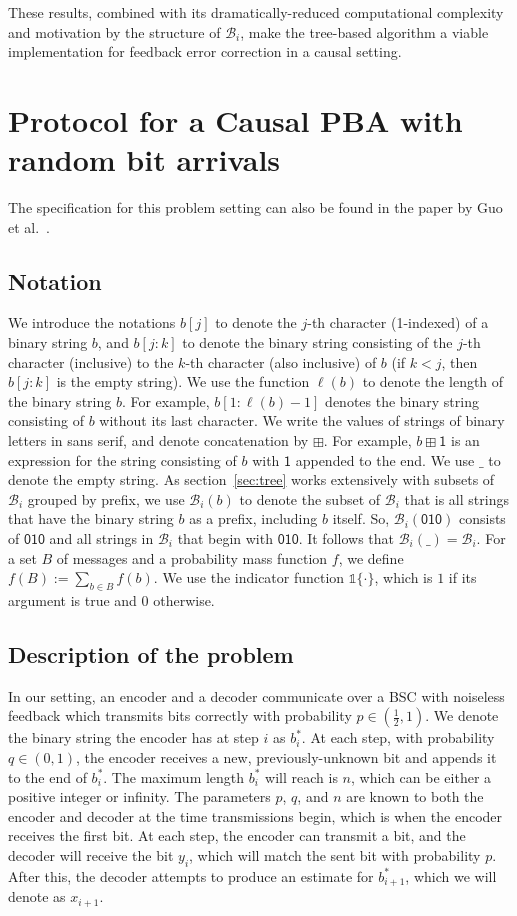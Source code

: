 \documentclass{IEEEtran}
\begin{document}
These results,
combined with its dramatically-reduced computational complexity and motivation
by the structure of $\mathcal{B}_i$, make the tree-based algorithm a
viable implementation for
feedback error correction in a causal setting.
\section{Protocol for a Causal PBA with random bit arrivals}
\label{sec:causalpba}
The specification for this problem setting can also be found in the
paper by Guo et al.~\cite{guosed}.
\subsection{Notation}
We introduce the notations $b[j]$ to denote the $j$-th
character (1-indexed) of a binary string $b$, and $b[j:k]$ to denote
the binary string consisting of the $j$-th character (inclusive) to the
$k$-th character (also inclusive) of $b$ (if $k < j$, then $b[j:k]$ is
the empty string).
We use the function
$\ell(b)$ to denote the length of the binary string $b$. For example,
$b[1:\ell(b)-1]$ denotes the binary string consisting of $b$ without its last
character. We write the values of strings of binary letters
in sans serif, and denote concatenation
by $\boxplus$. For example, $b\boxplus\mathsf{1}$ is an expression for the string
consisting of $b$ with $\mathsf{1}$ appended to the end.
We use $\mathsf{\_}$ to denote the empty string.
As section~\ref{sec:tree} works extensively with subsets
of $\mathcal{B}_i$ grouped by prefix, we use
$\mathcal{B}_i(b)$ to denote the subset of $\mathcal{B}_i$
that is all strings that have the binary string $b$ as a prefix,
including $b$ itself. So, $\mathcal{B}_i(\mathsf{010})$ consists
of $\mathsf{010}$ and all strings in $\mathcal{B}_i$ that begin
with $\mathsf{010}$. It follows that $\mathcal{B}_i(\mathsf{\_})
=\mathcal{B}_i$.
For a set $B$ of messages and a probability mass function $f$,
we define $f(B):=\sum_{b \in B}f(b)$.
We use the indicator function $\mathbb{1}\{\cdot\}$,
which is $1$ if its argument is true and $0$ otherwise.
\subsection{Description of the problem}
\label{ssec:probdescript}
In our setting, an encoder and a decoder communicate over a BSC
with noiseless feedback
which transmits bits correctly with probability $p \in (\frac{1}{2},1)$.
We denote the binary string the encoder has at step $i$ as $b_i^*$. At
each step, with probability $q \in (0,1)$, the encoder receives a new,
previously-unknown bit and appends it to the end of $b_i^*$. The maximum
length $b_i^*$ will reach is $n$, which can be either a positive integer
or infinity. The parameters $p$, $q$, and $n$ are known to both the encoder
and decoder at the time transmissions begin, which is when the encoder receives
the first bit. At each step, the encoder can transmit a bit, and the decoder
will receive the bit $y_i$, which will match the sent bit with probability $p$.
After this, the decoder attempts to produce an estimate for
$b_{i+1}^*$, which we will denote as $x_{i+1}$.
\end{document}
